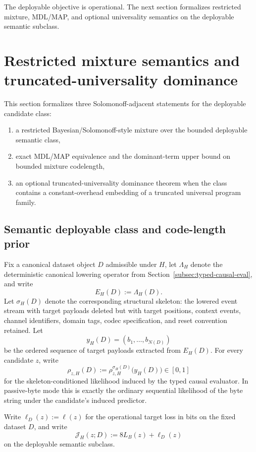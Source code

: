 \documentclass[11pt]{article}
\begin{document}
The deployable objective is operational.
The next section formalizes restricted mixture, MDL/MAP,
and optional universality semantics on the deployable semantic subclass.

\section{Restricted mixture semantics and truncated-universality dominance}
\label{sec:restricted-mixture}

This section formalizes three Solomonoff-adjacent statements for the deployable
candidate class:
\begin{enumerate}
    \item a restricted Bayesian/Solomonoff-style mixture over the bounded
    deployable semantic class,
    \item exact MDL/MAP equivalence and the dominant-term upper bound on bounded
    mixture codelength,
    \item an optional truncated-universality dominance theorem when the class
    contains a constant-overhead embedding of a truncated universal program
    family.
\end{enumerate}

\subsection{Semantic deployable class and code-length prior}

Fix a canonical dataset object $D$ admissible under $H$, let $\Lambda_H$
denote the deterministic canonical lowering operator from
Section~\ref{subsec:typed-causal-eval}, and write
\[
E_H(D):=\Lambda_H(D).
\]
Let $\sigma_H(D)$ denote the
corresponding structural skeleton: the lowered event stream with target
payloads deleted but with target positions, context events, channel
identifiers, domain tags, codec specification, and reset convention retained.
Let
\[
y_H(D)=(b_1,\dots,b_{N(D)})
\]
be the ordered sequence of target payloads extracted from $E_H(D)$. For every
candidate $z$, write
\[
\rho_{z,H}(D):=\rho_{z,H}^{\sigma_H(D)}\bigl(y_H(D)\bigr)\in[0,1]
\]
for the skeleton-conditioned likelihood induced by the typed causal evaluator.
In passive-byte mode this is exactly the ordinary sequential likelihood of the
byte string under the candidate's induced predictor.

Write $\ell_D(z):=\ell(z)$ for the operational target loss in bits on the
fixed dataset $D$, and write
\[
\mathcal{J}_H(z;D):=8L_B(z)+\ell_D(z)
\]
on the deployable semantic subclass.
\end{document}
